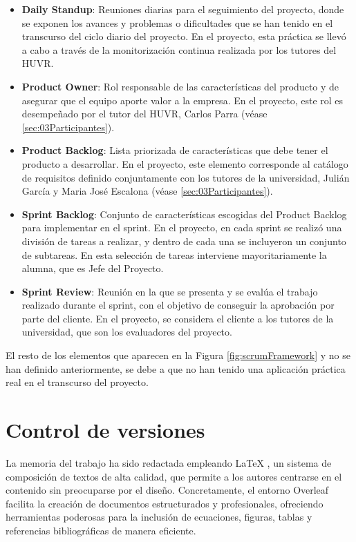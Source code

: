 \begin{itemize}
    \item \textbf{Daily Standup}: Reuniones diarias para el seguimiento del proyecto, donde se exponen los avances y problemas o dificultades que se han tenido en el transcurso del ciclo diario del proyecto. En el proyecto, esta práctica se llevó a cabo a través de la monitorización continua realizada por los tutores del HUVR.
    \item \textbf{Product Owner}: Rol responsable de las características del producto y de asegurar que el equipo aporte valor a la empresa. En el proyecto, este rol es desempeñado por el tutor del HUVR, Carlos Parra (véase \ref{sec:03Participantes}).
    \item \textbf{Product Backlog}: Lista priorizada de características que debe tener el producto a desarrollar. En el proyecto, este elemento corresponde al catálogo de requisitos definido conjuntamente con los tutores de la universidad, Julián García y Maria José Escalona (véase \ref{sec:03Participantes}).
    \item \textbf{Sprint Backlog}: Conjunto de características escogidas del Product Backlog para implementar en el sprint. En el proyecto, en cada sprint se realizó una división de tareas a realizar, y dentro de cada una se incluyeron un conjunto de subtareas. En esta selección de tareas interviene mayoritariamente la alumna, que es Jefe del Proyecto.
    \item \textbf{Sprint Review}: Reunión en la que se presenta y se evalúa el trabajo realizado durante el sprint, con el objetivo de conseguir la aprobación por parte del cliente. En el proyecto, se considera el cliente a los tutores de la universidad, que son los evaluadores del proyecto.
\end{itemize}

El resto de los elementos que aparecen en la Figura \ref{fig:scrumFramework} y no se han definido anteriormente, se debe a que no han tenido una aplicación práctica real en el transcurso del proyecto.

\section{Control de versiones} \label{sec:04cvs}

La memoria del trabajo ha sido redactada empleando LaTeX \cite{latex}, un sistema de composición de textos de alta calidad, que permite a los autores centrarse en el contenido sin preocuparse por el diseño. Concretamente, el entorno Overleaf facilita la creación de documentos estructurados y profesionales, ofreciendo herramientas poderosas para la inclusión de ecuaciones, figuras, tablas y referencias bibliográficas de manera eficiente.

